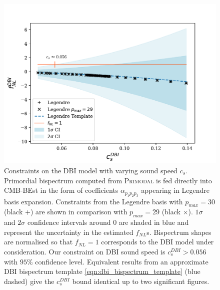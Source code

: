 \begin{figure}[htbp!] 
	\centering    
	\includegraphics[width=\textwidth]{dbi_sound_speed_scan_annotated_new.pdf}
	\caption{Constraints on the DBI model with varying sound speed $c_s$. Primordial bispectrum computed from \textsc{Primodal} is fed directly into CMB-BEst in the form of coefficients $\alpha_{p_1 p_2 p_3}$ appearing in Legendre basis expansion. Constraints from the Legendre basis with $p_{max}=30$ (black $+$) are shown in comparison with $p_{max}=29$ (black $\times$). $1\sigma$ and $2\sigma$ confidence intervals around $0$ are shaded in blue and represent the uncertainty in the estimated $f_{NL}$s. Bispectrum shapes are normalised so that $f_{NL}=1$ corresponds to the DBI model under consideration. Our constraint on DBI sound speed is $c^{DBI}_s > 0.056$ with $95\%$ confidence level. Equivalent results from an approximate DBI bispectrum template \eqref{eqn:dbi_bispectrum_template} (blue dashed) give the $c^{DBI}_s$ bound identical up to two significant figures.}
	\label{fig:dbi_sound_speed_scan}
\end{figure}

